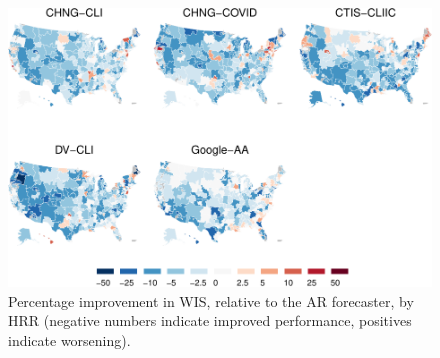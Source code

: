 \clearpage

\clearpage

\begin{figure}

{\centering \includegraphics[width=\textwidth]{fig/errs-in-space-1} 

}

\caption{Percentage improvement in WIS, relative to the AR forecaster, by HRR (negative numbers indicate improved performance, positives indicate worsening).}\label{fig:errs-in-space}
\end{figure}


